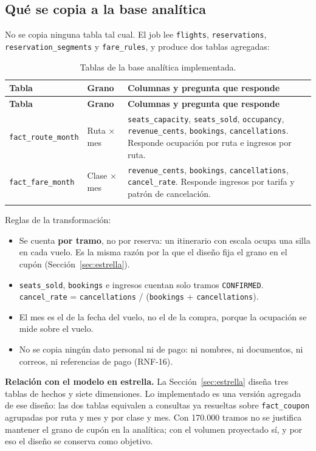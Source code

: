 \subsection{Qué se copia a la base analítica}
No se copia ninguna tabla tal cual. El job lee \texttt{flights}, \texttt{reservations}, \texttt{reservation\_segments} y \texttt{fare\_rules}, y produce dos tablas agregadas:

\begin{longtable}{@{}L{3.6cm} L{2.4cm} L{9.6cm}@{}}
\toprule \textbf{Tabla} & \textbf{Grano} & \textbf{Columnas y pregunta que responde} \\ \midrule \endfirsthead
\toprule \textbf{Tabla} & \textbf{Grano} & \textbf{Columnas y pregunta que responde} \\ \midrule \endhead
\texttt{fact\_route\_month} & Ruta $\times$ mes & \texttt{seats\_capacity}, \texttt{seats\_sold}, \texttt{occupancy}, \texttt{revenue\_cents}, \texttt{bookings}, \texttt{cancellations}. Responde ocupación por ruta e ingresos por ruta. \\
\texttt{fact\_fare\_month} & Clase $\times$ mes & \texttt{revenue\_cents}, \texttt{bookings}, \texttt{cancellations}, \texttt{cancel\_rate}. Responde ingresos por tarifa y patrón de cancelación. \\
\bottomrule
\caption{Tablas de la base analítica implementada.}
\end{longtable}

Reglas de la transformación:
\begin{itemize}
  \item Se cuenta \textbf{por tramo}, no por reserva: un itinerario con escala ocupa una silla en cada vuelo. Es la misma razón por la que el diseño fija el grano en el cupón (Sección~\ref{sec:estrella}).
  \item \texttt{seats\_sold}, \texttt{bookings} e ingresos cuentan solo tramos \texttt{CONFIRMED}. \texttt{cancel\_rate} = \texttt{cancellations} / (\texttt{bookings} + \texttt{cancellations}).
  \item El mes es el de la fecha del vuelo, no el de la compra, porque la ocupación se mide sobre el vuelo.
  \item No se copia ningún dato personal ni de pago: ni nombres, ni documentos, ni correos, ni referencias de pago (RNF-16).
\end{itemize}

\textbf{Relación con el modelo en estrella.} La Sección~\ref{sec:estrella} diseña tres tablas de hechos y siete dimensiones. Lo implementado es una versión agregada de ese diseño: las dos tablas equivalen a consultas ya resueltas sobre \texttt{fact\_coupon} agrupadas por ruta y mes y por clase y mes. Con 170.000 tramos no se justifica mantener el grano de cupón en la analítica; con el volumen proyectado sí, y por eso el diseño se conserva como objetivo.

